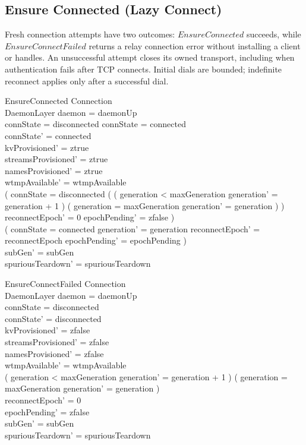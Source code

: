 \documentclass[a4paper,10pt,fleqn]{article}
\begin{document}
\subsection{Ensure Connected (Lazy Connect)}

Fresh connection attempts have two outcomes: $EnsureConnected$ succeeds,
while $EnsureConnectFailed$ returns a relay connection error without
installing a client or handles.  An unsuccessful attempt closes its owned
transport, including when authentication fails after TCP connects.  Initial
dials are bounded; indefinite reconnect applies only after a successful dial.

\begin{schema}{EnsureConnected}
  \Delta Connection \\
  \Xi DaemonLayer
  \where
  daemon = daemonUp \\
  connState = disconnected \lor connState = connected \\
  connState' = connected \\
  kvProvisioned' = ztrue \\
  streamsProvisioned' = ztrue \\
  namesProvisioned' = ztrue \\
  wtmpAvailable' = wtmpAvailable \\
  ( connState = disconnected \land
    ( ( generation < maxGeneration \land
        generation' = generation + 1 ) \lor
      ( generation = maxGeneration \land
        generation' = generation ) ) \land
    reconnectEpoch' = 0 \land epochPending' = zfalse ) \lor \\
  ( connState = connected \land generation' = generation \land
    reconnectEpoch' = reconnectEpoch \land epochPending' = epochPending ) \\
  subGen' = subGen \\
  spuriousTeardown' = spuriousTeardown
\end{schema}

\begin{schema}{EnsureConnectFailed}
  \Delta Connection \\
  \Xi DaemonLayer
  \where
  daemon = daemonUp \\
  connState = disconnected \\
  connState' = disconnected \\
  kvProvisioned' = zfalse \\
  streamsProvisioned' = zfalse \\
  namesProvisioned' = zfalse \\
  wtmpAvailable' = wtmpAvailable \\
  ( generation < maxGeneration \land
    generation' = generation + 1 ) \lor
  ( generation = maxGeneration \land generation' = generation ) \\
  reconnectEpoch' = 0 \\
  epochPending' = zfalse \\
  subGen' = subGen \\
  spuriousTeardown' = spuriousTeardown
\end{schema}
\end{document}
